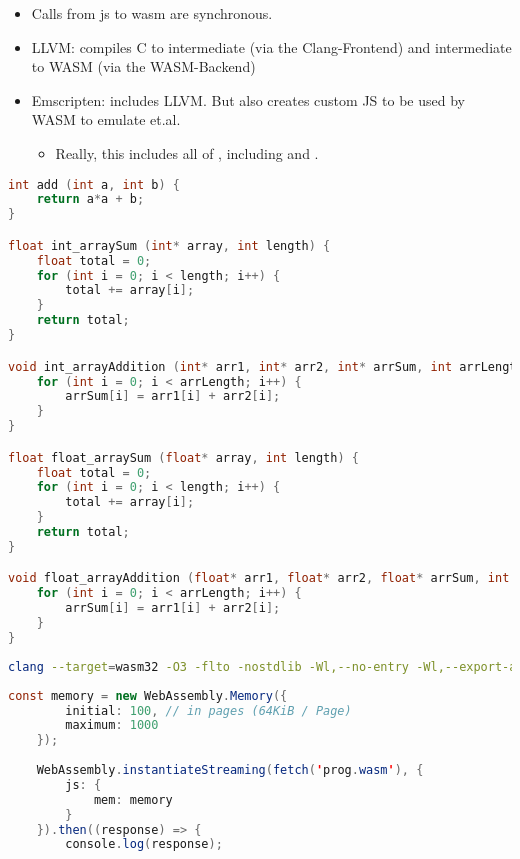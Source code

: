 {\begin{itemize}
    \item Calls from js to wasm are synchronous.
\end{itemize}

\begin{itemize}
    \item LLVM: compiles C to intermediate (via the Clang-Frontend) and intermediate to WASM (via the WASM-Backend)
    \item Emscripten: includes LLVM. But also creates custom JS to be used by WASM to emulate  et.al.
    \begin{itemize} 
        \item Really, this includes all of , including  and .
    \end{itemize}
\end{itemize}


\begin{lstlisting}[language=c]
int add (int a, int b) {
    return a*a + b;
}

float int_arraySum (int* array, int length) {
    float total = 0; 
    for (int i = 0; i < length; i++) {
        total += array[i];
    }
    return total;
}

void int_arrayAddition (int* arr1, int* arr2, int* arrSum, int arrLength) {
    for (int i = 0; i < arrLength; i++) {
        arrSum[i] = arr1[i] + arr2[i];
    }
}

float float_arraySum (float* array, int length) {
    float total = 0; 
    for (int i = 0; i < length; i++) {
        total += array[i];
    }
    return total;
}

void float_arrayAddition (float* arr1, float* arr2, float* arrSum, int arrLength) {
    for (int i = 0; i < arrLength; i++) {
        arrSum[i] = arr1[i] + arr2[i];
    }
}
\end{lstlisting}

\begin{lstlisting}[language=bash]
    clang --target=wasm32 -O3 -flto -nostdlib -Wl,--no-entry -Wl,--export-all -Wl,--lto-O3 -o prog.wasm prog.c
\end{lstlisting}

\begin{lstlisting}[language=java]
    const memory = new WebAssembly.Memory({
        initial: 100, // in pages (64KiB / Page)
        maximum: 1000
    });
    
    WebAssembly.instantiateStreaming(fetch('prog.wasm'), {
        js: {
            mem: memory
        }
    }).then((response) => {
        console.log(response);
    

\end{lstlisting}}
